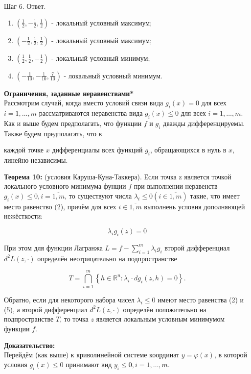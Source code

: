 \documentclass[a4paper,12pt]{article} %
\begin{document}
Шаг 6. Ответ.

\begin{enumerate}
\item $\left(\frac{1}{2},-\frac{1}{2}, \frac{1}{2}\right)$ - локальный условный максимум;

\item $\left(-\frac{1}{2}, \frac{1}{2}, \frac{1}{2}\right)$ - локальный условный максимум;

\item $\left(\frac{1}{2}, \frac{1}{2},-\frac{1}{2}\right)$ - локальный условный минимум;

\item $\left(-\frac{1}{10},-\frac{1}{10}, \frac{7}{10}\right)$ - локальный условный минимум.

\end{enumerate}

\textbf{Ограничения, заданные неравенствами*}\\
Рассмотрим случай, когда вместо условий связи вида $g_{i}(x)=0$ для всех $i=1, \ldots, m$ рассматриваются неравенства вида $g_{i}(x) \leq 0$ для всех $i=1, \ldots, m$. Как и выше будем предполагать, что функции $f$ и $g_{i}$ дважды дифференцируемы. Также будем предполагать, что в

каждой точке $x$ дифференциалы всех функций $g_i$, обращающихся в нуль в $x$, линейно независимы.

\textbf{Теорема 10:} (условия Каруша-Куна-Таккера). Если точка z является точкой локального условного минимума фунции $f$ при выполнении неравенств $g_{i}(x) \leq 0, i=\overline{1, m}$, то существуют числа $\lambda_{i} \leq 0(i \in \overline{1, m})$ такие, что имеет место равенство (2), причём для всех $i \in \overline{1, m}$ выполнень условия дополняющей нежёсткости:

$$
\lambda_{i} g_{i}(z)=0
$$

При этом для функции Лагранжа $L=f-\sum_{i=1}^{m} \lambda_{i} g_{i}$ второй дифференциал $d^{2} L(z, \cdot)$ определён неотрицательно на подпространстве

$$
T=\bigcap_{i=1}^{m}\left\{h \in \mathbb{R}^{n}: \lambda_{i} \cdot d g_{i}(z, h)=0\right\} .
$$

Обратно, если для некоторого набора чисел $\lambda_{i} \leq 0$ имеют место равенства (2) и (5), а второй дифференциал $d^{2} L(z, \cdot)$ определён положительно на подпространстве $T$, то точка $z$ является локальным условным минимумом функции $f$.

\textbf{Доказательство:}\\
Перейдём (как выше) к криволинейной системе координат $y=\varphi(x)$, в которой условия $g_{i}(x) \leq 0$ принимают вид $y_{i} \leq 0, i=1, \ldots, m$.
\end{document}
